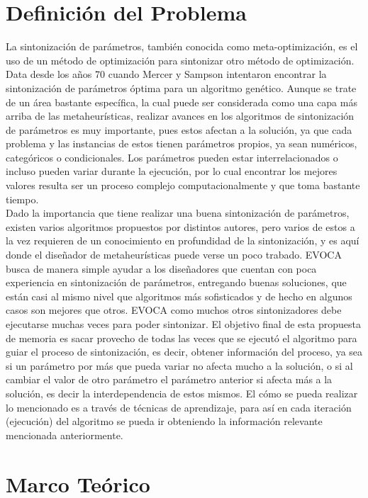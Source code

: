 \documentclass[letter, 10pt]{article}
\begin{document}
\begin{multicols}{2}
\section{Definici\'on del Problema}

La sintonización de parámetros, también conocida como meta-optimización, es el uso de un método de optimización para sintonizar otro método de optimización. Data desde los años 70 cuando Mercer y Sampson \cite{MercerSampson72} intentaron encontrar la sintonización de parámetros óptima para un algoritmo genético. Aunque se trate de un área bastante específica, la cual puede ser considerada como una capa más arriba de las metaheurísticas, realizar avances en los algoritmos de sintonización de parámetros es muy importante, pues estos afectan a la solución, ya que cada problema y las instancias de estos tienen parámetros propios, ya sean numéricos, categóricos o condicionales. Los parámetros pueden estar interrelacionados o incluso pueden variar durante la ejecución, por lo cual encontrar los mejores valores resulta ser un proceso complejo computacionalmente y que toma bastante tiempo. \\

Dado la importancia que tiene realizar una buena sintonización de parámetros, existen varios algoritmos propuestos por distintos autores, pero varios de estos a la vez requieren de un conocimiento en profundidad de la sintonización, y es aquí donde el diseñador de metaheurísticas puede verse un poco trabado. EVOCA busca de manera simple ayudar a los diseñadores que cuentan con poca experiencia en sintonización de parámetros, entregando buenas soluciones, que están casi al mismo nivel que algoritmos más sofisticados y de hecho en algunos casos son mejores que otros. EVOCA como muchos otros sintonizadores debe ejecutarse muchas veces para poder sintonizar. El objetivo final de esta propuesta de memoria es sacar provecho de todas las veces que se ejecutó el algoritmo para guiar el proceso de sintonización, es decir, obtener información del proceso, ya sea si un parámetro por más que pueda variar no afecta mucho a la solución, o si al cambiar el valor de otro parámetro el parámetro anterior si afecta más a la solución, es decir la interdependencia de estos mismos. El cómo se pueda realizar lo mencionado es a través de técnicas de aprendizaje, para así en cada iteración (ejecución) del algoritmo se pueda ir obteniendo la información relevante mencionada anteriormente.

\section{Marco Teórico}


\end{multicols}
\end{document}
